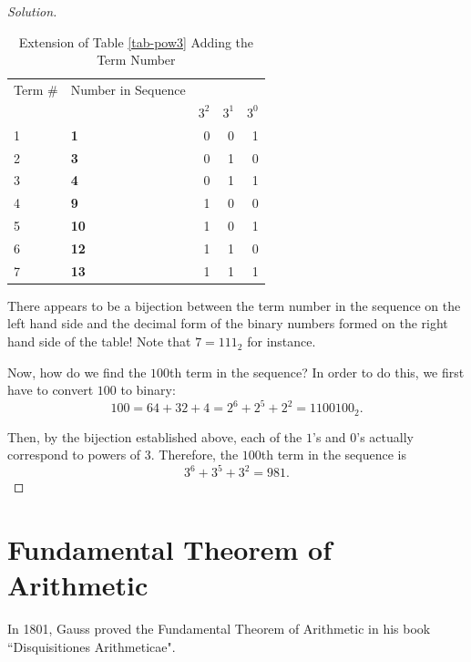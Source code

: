 \begin{proof}[Solution]
\begin{table}[h]
	\centering
	\begin{tabular}{|l|l | r r r|}
		\toprule
		Term \# & Number in Sequence & & &\\
		& & $3^2$ & $3^1$ & $3^0$ \\ 
		\midrule
		1&\textbf{1} & 0 & 0 & 1 \\
		2&\textbf{3} & 0 & 1 & 0 \\
		3&\textbf{4} & 0 & 1 & 1 \\
		4&\textbf{9} & 1 & 0 & 0 \\
		5&\textbf{10} & 1 & 0 & 1 \\
		6&\textbf{12} & 1 & 1 & 0 \\
		7&\textbf{13} & 1 & 1 & 1 \\
		\bottomrule
	\end{tabular}
	\caption{Extension of Table \ref{tab-pow3} Adding the Term Number}
\end{table}

\clearpage

There appears to be a bijection between the term number in the sequence on the left hand side and the decimal form of the binary numbers formed on the right hand side of the table!  Note that $7=111_2$ for instance. 

Now, how do we find the $100$th term in the sequence? In order to do this, we first have to convert $100$ to binary: $$100=64+32+4=2^6+2^5+2^2=1100100_2.$$  

Then, by the bijection established above, each of the $1$'s and $0$'s actually correspond to powers of $3$. Therefore, the $100$th term in the sequence is $$3^6+3^5+3^2=\boxed{981}.$$  \end{proof}



\clearpage



\section{Fundamental Theorem of Arithmetic}

In 1801, Gauss proved the Fundamental Theorem of Arithmetic in his book ``Disquisitiones Arithmeticae". 


